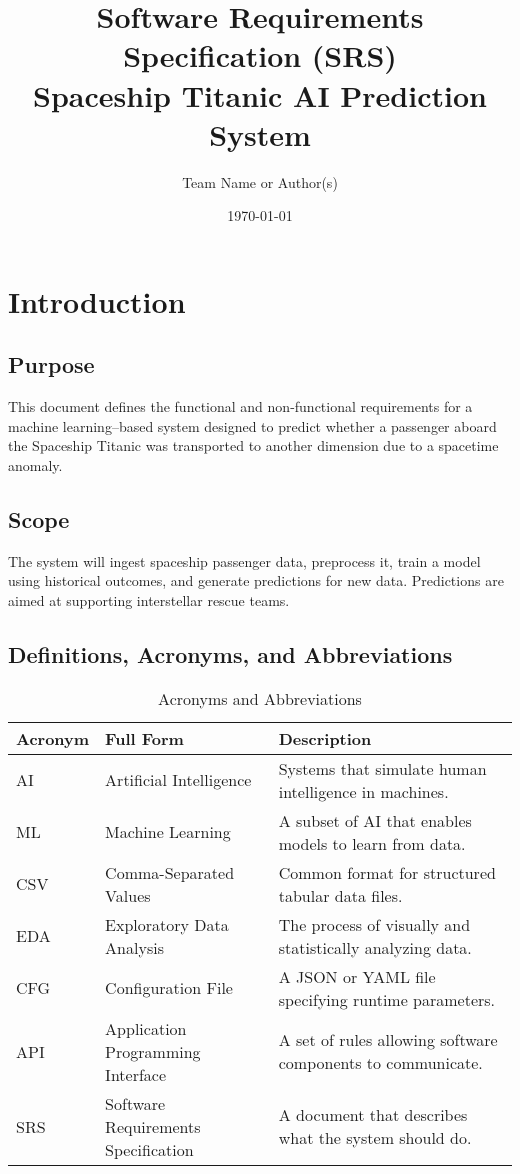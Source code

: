 \documentclass[15pt]{article}
\title{Software Requirements Specification (SRS)\\\large Spaceship Titanic AI Prediction System}
\author{Team Name or Author(s)}
\date{\today}
\begin{document}
\maketitle
\tableofcontents
\newpage

\section{Introduction}
\subsection{Purpose}
This document defines the functional and non-functional requirements for a machine learning–based system designed to predict whether a passenger aboard the Spaceship Titanic was transported to another dimension due to a spacetime anomaly.

\subsection{Scope}
The system will ingest spaceship passenger data, preprocess it, train a model using historical outcomes, and generate predictions for new data. Predictions are aimed at supporting interstellar rescue teams.

\subsection{Definitions, Acronyms, and Abbreviations}
\begin{table}[h!]
  \centering
  \begin{tabular}{|l|l|p{8cm}|}
  \hline
  \textbf{Acronym} & \textbf{Full Form}                       & \textbf{Description} \\
  \hline
  AI    & Artificial Intelligence                  & Systems that simulate human intelligence in machines. \\
  ML    & Machine Learning                         & A subset of AI that enables models to learn from data. \\
  CSV   & Comma-Separated Values                   & Common format for structured tabular data files. \\
  EDA   & Exploratory Data Analysis                & The process of visually and statistically analyzing data. \\
  CFG   & Configuration File                       & A JSON or YAML file specifying runtime parameters. \\
  API   & Application Programming Interface        & A set of rules allowing software components to communicate. \\
  SRS   & Software Requirements Specification      & A document that describes what the system should do. \\
  \hline
  \end{tabular}
  \caption{Acronyms and Abbreviations}
\end{table}
\end{document}
